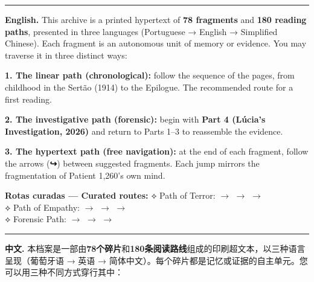 \vspace{0.8em}

\noindent\rule{\textwidth}{0.5pt}
\vspace{0.6em}

\noindent\textbf{English.} This archive is a printed hypertext of \textbf{78 fragments} and \textbf{180 reading paths}, presented in three languages (Portuguese → English → Simplified Chinese). Each fragment is an autonomous unit of memory or evidence. You may traverse it in three distinct ways:

\vspace{0.6em}

\noindent\textbf{1. The linear path (chronological):} follow the sequence of the pages, from childhood in the Sertão (1914) to the Epilogue. The recommended route for a first reading.

\vspace{0.4em}
\noindent\textbf{2. The investigative path (forensic):} begin with \textbf{Part 4 (Lúcia's Investigation, 2026)} and return to Parts 1--3 to reassemble the evidence.

\vspace{0.4em}
\noindent\textbf{3. The hypertext path (free navigation):} at the end of each fragment, follow the arrows (\textbf{↪}) between suggested fragments. Each jump mirrors the fragmentation of Patient 1,260's own mind.

\vspace{0.6em}

\noindent\textbf{Rotas curadas --- Curated routes:}
\let\trilangref\trilangrefen
\noindent\textcolor{sangue}{⟡ Path of Terror:}  $\rightarrow$  $\rightarrow$  $\rightarrow$ \\[0.2em]
\noindent\textcolor{sangue}{⟡ Path of Empathy:}  $\rightarrow$  $\rightarrow$  $\rightarrow$ \\[0.2em]
\noindent\textcolor{sangue}{⟡ Forensic Path:}  $\rightarrow$  $\rightarrow$  $\rightarrow$ 

\vspace{0.8em}

\noindent\rule{\textwidth}{0.5pt}
\vspace{0.6em}

\noindent\textbf{中文.} 本档案是一部由\textbf{78个碎片}和\textbf{180条阅读路线}组成的印刷超文本，以三种语言呈现（葡萄牙语 → 英语 → 简体中文）。每个碎片都是记忆或证据的自主单元。您可以用三种不同方式穿行其中：


